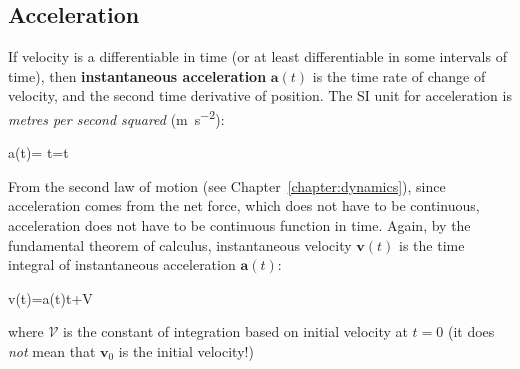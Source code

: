 %


\subsection{Acceleration}

If velocity is a differentiable in time (or at least differentiable in some
intervals of time), then \textbf{instantaneous acceleration} $\bm a(t)$ is the
time rate of change of velocity, and the second time derivative of position.
The SI unit for acceleration is \emph{metres per second squared}
(\si{\metre\per\second\squared}):
\begin{important-equation}
  \bm a(t)= t=t
\end{important-equation}
From the second law of motion (see Chapter~\ref{chapter:dynamics}), since
acceleration comes from the net force, which does not have to be continuous,
acceleration does not have to be continuous function in time.
Again, by the fundamental theorem of calculus, instantaneous velocity
$\bm v(t)$ is the time integral of instantaneous acceleration $\bm a(t)$:
\begin{important-equation}
  \bm v(t)=\int\bm a(t)\dl t+\mathcal V
\end{important-equation}
where $\mathcal V$ is the constant of integration based on initial velocity at
$t=0$ (it does \emph{not} mean that $\bm v_0$ is the initial velocity!)



